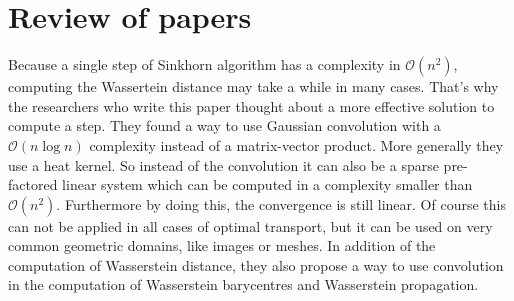 \chapter{Review of papers}

\myminitoc


\cite{Cut}


\cite{Arj++}


Because a single step of Sinkhorn algorithm has a complexity in $\mathcal{O}(n^2)$, computing the Wassertein distance may take a while in many cases. That's why the researchers who write this paper thought about a more effective solution to compute a step. They found a way to use Gaussian convolution with a $\mathcal{O}(n \log n)$ complexity instead of a matrix-vector product. More generally they use a heat kernel. So instead of the convolution it can also be a sparse pre-factored linear system which can be computed in a complexity smaller than $\mathcal{O}(n^2)$. Furthermore by doing this, the convergence is still linear. Of course this can not be applied in all cases of optimal transport, but it can be used on very common geometric domains, like images or meshes. In addition of the computation of Wasserstein distance, they also propose a way to use convolution in the computation of Wasserstein barycentres and Wasserstein propagation.

